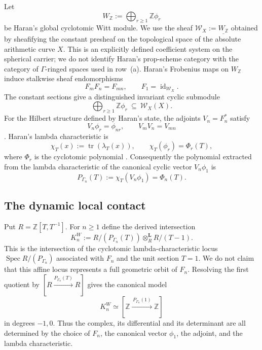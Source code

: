 \documentclass[11pt]{amsart}
\theoremstyle{definition}
\theoremstyle{remark}
\newcommand{\Z}{\mathbb Z}
\begin{document}
Let
\[
 W_{\Z}:=\bigoplus_{r\geq1}\Z\phi_r
\]
be Haran's global cyclotomic Witt module.  We use the sheaf
$\mathcal W_X:=\underline{W_{\Z}}$ obtained by sheafifying the constant
presheaf on the topological space of the absolute arithmetic curve $X$.
This is an explicitly defined coefficient system on the spherical carrier;
we do not identify Haran's prop-scheme category with the category of
$\Gamma$-ringed spaces used in row~(a).  Haran's Frobenius maps on $W_\Z$
induce stalkwise sheaf endomorphisms
\begin{equation}\label{eq:Frobmult}
 F_mF_n=F_{mn},\qquad F_1=\operatorname{id}_{\mathcal W_X}.
\end{equation}
The constant sections give a distinguished invariant cyclic submodule
\begin{equation}\label{eq:Wittbasis}
 \bigoplus_{r\geq1}\Z\phi_r\ \subseteq\ \mathcal W_X(X).
\end{equation}
For the Hilbert structure defined by Haran's state, the adjoints
$V_n=F_n^*$ satisfy
\begin{equation}\label{eq:versch}
 V_n\phi_r=\phi_{nr},\qquad V_mV_n=V_{mn}
\end{equation}
\cite[(12.35),(12.37)]{Haran2022}.  Haran's lambda characteristic is
\begin{equation}\label{eq:HaranLambdaCharacteristic}
 \chi_T(x):=\operatorname{tr}(\lambda_T(x)),\qquad
 \chi_T(\phi_r)=\Phi_r(T),
\end{equation}
where $\Phi_r$ is the cyclotomic polynomial
\cite[(13.37)]{Haran2022}.  Consequently the polynomial extracted from the
lambda characteristic of the canonical cyclic vector $V_n\phi_1$ is
\begin{equation}\label{eq:dynamicPolynomial}
 P_{\Gamma_n}(T):=\chi_T(V_n\phi_1)=\Phi_n(T).
\end{equation}

\subsection{The dynamic local contact}

Put $R=\Z[T,T^{-1}]$.  For $n\geq1$ define the derived intersection
\begin{equation}\label{eq:derivedWittContact}
 K_n^W:=
 R/(P_{\Gamma_n}(T))
 \mathbin{\otimes_R^{\mathbf L}}R/(T-1).
\end{equation}
This is the intersection of the cyclotomic lambda-characteristic locus
$\operatorname{Spec}R/(P_{\Gamma_n})$ associated with $F_n$ and the unit
section $T=1$.  We do not claim that this affine locus represents a full
geometric orbit of $F_n$.  Resolving the first quotient by
$[R\xrightarrow{P_{\Gamma_n}(T)}R]$ gives the canonical model
\begin{equation}\label{eq:derivedWittContactModel}
 K_n^W\simeq
 [\Z\xrightarrow{\,P_{\Gamma_n}(1)\,}\Z]
\end{equation}
in degrees $-1,0$.  Thus the complex, its differential and its determinant
are all determined by the choice of $F_n$, the canonical vector $\phi_1$,
the adjoint, and the lambda characteristic.
\end{document}

